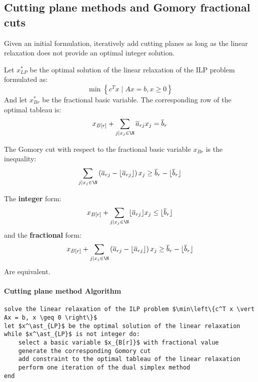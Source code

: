 \subsection{Cutting plane methods and Gomory fractional cuts}
Given an initial formulation, iteratively add cutting planes as long as the linear relaxation does not provide an optimal integer solution.

Let $x^\ast_{LP}$ be the optimal solution of the linear relaxation of the ILP problem formulated as:
\[ \min \left\{ c^T x \mid Ax = b, x \geq 0 \right\} \]
And let $x^\ast_{B{r}}$ be the fractional basic variable.
The corresponding row of the optimal tableau is:
\[ x_{B[r]} + \displaystyle \sum_{j \vert x_j \in \N} \overline{a}_{rj} x_j = \overline{b}_r \]
\begin{definition}
    The Gomory cut with respect to the fractional basic variable $x_{B{r}}$ is the inequality:
    \[ \displaystyle \sum_{j \vert x_j \in \N} \left( \overline{a}_{rj} - \lfloor \overline{a}_{rj} \rfloor \right) x_j \geq \overline{b}_r - \lfloor \overline{b}_r \rfloor \]
\end{definition}

\begin{property}
    The \textbf{integer} form:
    \[ \displaystyle x_{B[r]} + \sum_{j \vert x_j \in \N} \lfloor\overline{a}_{rj}\rfloor x_j \leq \lfloor\overline{b}_r\rfloor \]
    and the \textbf{fractional} form:
    \[ \displaystyle x_{B[r]} + \sum_{j \vert x_j \in \N} \left( \overline{a}_{rj} - \lfloor \overline{a}_{rj} \rfloor \right) x_j \geq \overline{b}_r - \lfloor \overline{b}_r \rfloor \]
    Are equivalent.
\end{property}

\paragraph*{Cutting plane method Algorithm}

\begin{lstlisting}
solve the linear relaxation of the ILP problem $\min\left\{c^T x \vert Ax = b, x \geq 0 \right\}$
let $x^\ast_{LP}$ be the optimal solution of the linear relaxation
while $x^\ast_{LP}$ is not integer do:
    select a basic variable $x_{B[r]}$ with fractional value
    generate the corresponding Gomory cut
    add constraint to the optimal tableau of the linear relaxation
    perform one iteration of the dual simplex method
end
\end{lstlisting}

